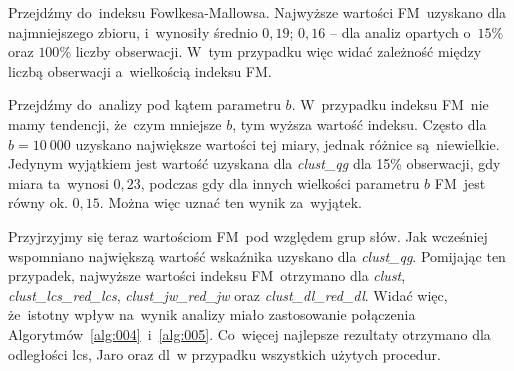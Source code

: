 \documentclass{praca1}
\begin{document}
Przejdźmy do~indeksu Fowlkesa-Mallowsa. Najwyższe wartości FM~uzyskano dla najmniejszego zbioru, i~wynosiły średnio $0,19$; $0,16$ -- dla analiz opartych o~$15\%$ oraz $100\%$ liczby obserwacji. W~tym przypadku więc widać zależność między liczbą obserwacji a~wielkością indeksu FM.


Przejdźmy do~analizy pod kątem parametru $b$. W~przypadku indeksu FM~nie mamy tendencji, że~czym mniejsze $b$, tym wyższa wartość indeksu. Często dla $b=10\ 000$ uzyskano największe wartości tej miary, jednak różnice są~niewielkie. Jedynym wyjątkiem jest wartość uzyskana dla \emph{clust\_qg} dla 15\% obserwacji, gdy miara ta~wynosi $0,23$, podczas gdy dla innych wielkości parametru $b$ FM~jest równy ok. $0,15$. Można więc uznać ten wynik za~wyjątek.


Przyjrzyjmy się teraz wartościom FM~pod względem grup słów. Jak wcześniej wspomniano największą wartość wskaźnika uzyskano dla \emph{clust\_qg}. Pomijając ten przypadek, najwyższe wartości indeksu FM~otrzymano dla \emph{clust}, \emph{clust\_lcs\_red\_lcs}, \emph{clust\_jw\_red\_jw} oraz \emph{clust\_dl\_red\_dl}. Widać więc, że~istotny wpływ na~wynik analizy miało zastosowanie połączenia Algorytmów~\ref{alg:004}~i~\ref{alg:005}. Co~więcej najlepsze rezultaty otrzymano dla odległości lcs, Jaro oraz dl~w przypadku wszystkich użytych procedur.

\end{document}
